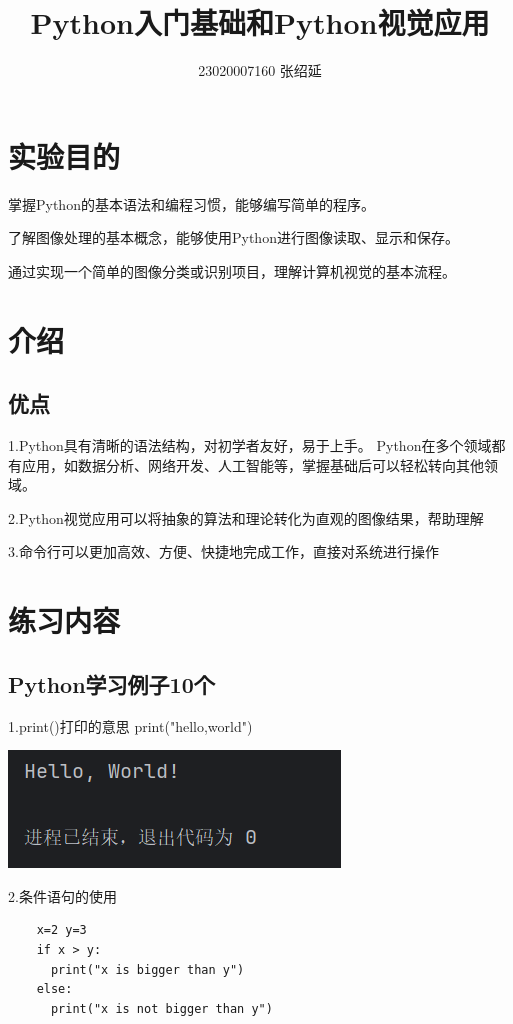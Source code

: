 \documentclass{article}
\title{Python入门基础和Python视觉应用}
\author{23020007160  张绍延}
\begin{document}
\maketitle

\section{实验目的}
掌握Python的基本语法和编程习惯，能够编写简单的程序。

了解图像处理的基本概念，能够使用Python进行图像读取、显示和保存。

通过实现一个简单的图像分类或识别项目，理解计算机视觉的基本流程。

\section{介绍}
\subsection{优点}
1.Python具有清晰的语法结构，对初学者友好，易于上手。
Python在多个领域都有应用，如数据分析、网络开发、人工智能等，掌握基础后可以轻松转向其他领域。

2.Python视觉应用可以将抽象的算法和理论转化为直观的图像结果，帮助理解

3.命令行可以更加高效、方便、快捷地完成工作，直接对系统进行操作
\section{练习内容}
\subsection{Python学习例子10个}

1.print()打印的意思
print("hello,world")

\noindent
\begin{minipage}{\linewidth}
  \centering
  \includegraphics[width=0.5\linewidth]{python1.png}
  \label{fig:example}
\end{minipage}


2.条件语句的使用
\begin{verbatim}
    x=2 y=3
    if x > y:
      print("x is bigger than y")
    else:
      print("x is not bigger than y")

 \end{verbatim}
\end{document}

